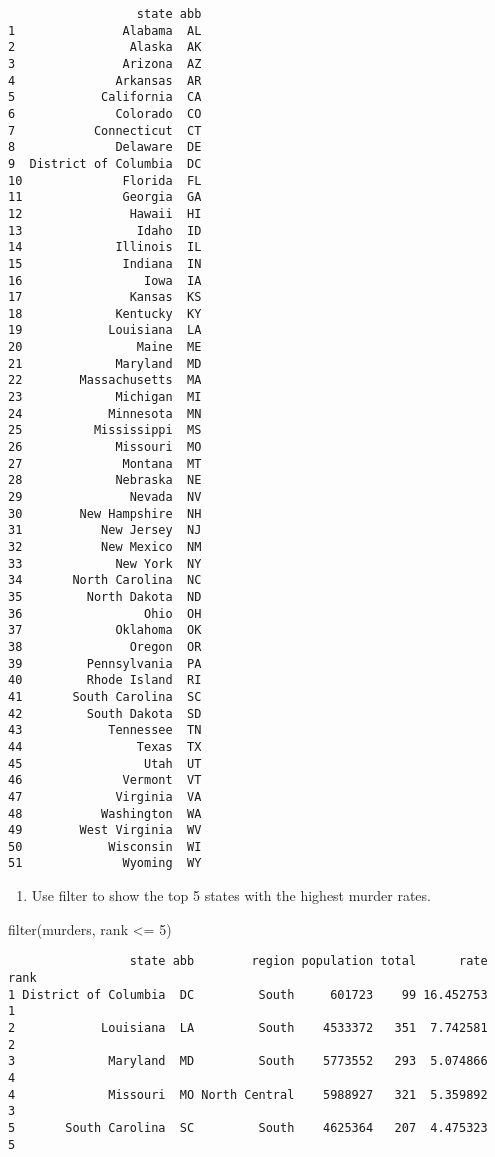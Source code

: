 \documentclass[
  letterpaper,
  DIV=11,
  numbers=noendperiod]{scrreprt}
\newenvironment{Shaded}{\begin{snugshade}}{\end{snugshade}}
\newcommand{\DecValTok}[1]{\textcolor[rgb]{0.68,0.00,0.00}{#1}}
\newcommand{\FunctionTok}[1]{\textcolor[rgb]{0.28,0.35,0.67}{#1}}
\newcommand{\NormalTok}[1]{\textcolor[rgb]{0.00,0.23,0.31}{#1}}
\newcommand{\SpecialCharTok}[1]{\textcolor[rgb]{0.37,0.37,0.37}{#1}}
\providecommand{\tightlist}{%
  \setlength{\itemsep}{0pt}\setlength{\parskip}{0pt}}
\begin{document}
\begin{verbatim}
                  state abb
1               Alabama  AL
2                Alaska  AK
3               Arizona  AZ
4              Arkansas  AR
5            California  CA
6              Colorado  CO
7           Connecticut  CT
8              Delaware  DE
9  District of Columbia  DC
10              Florida  FL
11              Georgia  GA
12               Hawaii  HI
13                Idaho  ID
14             Illinois  IL
15              Indiana  IN
16                 Iowa  IA
17               Kansas  KS
18             Kentucky  KY
19            Louisiana  LA
20                Maine  ME
21             Maryland  MD
22        Massachusetts  MA
23             Michigan  MI
24            Minnesota  MN
25          Mississippi  MS
26             Missouri  MO
27              Montana  MT
28             Nebraska  NE
29               Nevada  NV
30        New Hampshire  NH
31           New Jersey  NJ
32           New Mexico  NM
33             New York  NY
34       North Carolina  NC
35         North Dakota  ND
36                 Ohio  OH
37             Oklahoma  OK
38               Oregon  OR
39         Pennsylvania  PA
40         Rhode Island  RI
41       South Carolina  SC
42         South Dakota  SD
43            Tennessee  TN
44                Texas  TX
45                 Utah  UT
46              Vermont  VT
47             Virginia  VA
48           Washington  WA
49        West Virginia  WV
50            Wisconsin  WI
51              Wyoming  WY
\end{verbatim}

\begin{enumerate}
\def\labelenumi{\arabic{enumi}.}
\setcounter{enumi}{3}
\tightlist
\item
  Use filter to show the top 5 states with the highest murder rates.
\end{enumerate}

\begin{Shaded}
\begin{Highlighting}[]
\FunctionTok{filter}\NormalTok{(murders,  rank }\SpecialCharTok{\textless{}=} \DecValTok{5}\NormalTok{)}
\end{Highlighting}
\end{Shaded}

\begin{verbatim}
                 state abb        region population total      rate rank
1 District of Columbia  DC         South     601723    99 16.452753    1
2            Louisiana  LA         South    4533372   351  7.742581    2
3             Maryland  MD         South    5773552   293  5.074866    4
4             Missouri  MO North Central    5988927   321  5.359892    3
5       South Carolina  SC         South    4625364   207  4.475323    5
\end{verbatim}
\end{document}
